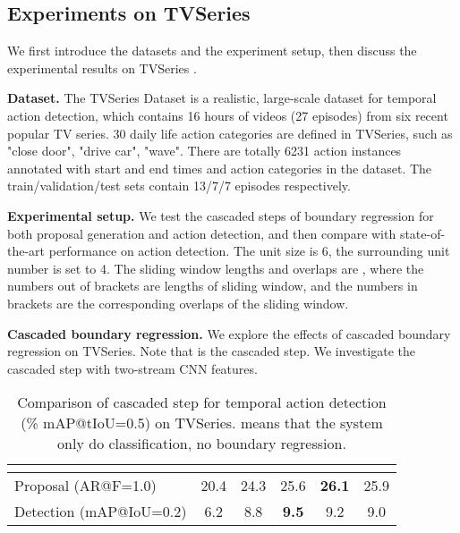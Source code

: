 \documentclass{bmvc2k}
\begin{document}
\subsection{Experiments on TVSeries}
We first introduce the datasets and the experiment setup, then discuss the experimental results on TVSeries \cite{de2016online}.

\textbf{Dataset.} The TVSeries Dataset \cite{de2016online} is a realistic, large-scale dataset for temporal action detection, which contains 16 hours of videos (27 episodes) from six recent popular TV series. 30 daily life action categories are defined in TVSeries, such as "close door", "drive car", "wave". There are totally 6231 action instances annotated with start and end times and action categories in the dataset. The train/validation/test sets contain 13/7/7 episodes respectively.

\textbf{Experimental setup.} We test the cascaded steps of boundary regression for both proposal generation and action detection, and then compare with state-of-the-art performance on action detection. The unit size  is 6, the surrounding unit number  is set to 4. The sliding window lengths and overlaps are , where the numbers out of brackets are lengths of sliding window, and the numbers in brackets are the corresponding overlaps of the sliding window.



\textbf{Cascaded boundary regression.}
We explore the effects of cascaded boundary regression on TVSeries. Note that  is the cascaded step. We investigate the cascaded step with two-stream CNN features.

\begin{table}[h]\small
\centering
\caption{Comparison of cascaded step  for temporal action detection (\% mAP@tIoU=0.5) on TVSeries.  means that the system only do classification, no boundary regression.}
\label{cas-tv}
\begin{tabular}{l|c|c|c|c|c}
\hline
           & \multicolumn{1}{c|}{} &  & \multicolumn{1}{c|}{} & \multicolumn{1}{c|}{} & \multicolumn{1}{c}{} \\ \hline
Proposal (AR@F=1.0)        & 20.4 &   24.3  &      25.6      &       \textbf{26.1}       &     25.9      \\ \hline
Detection (mAP@IoU=0.2) & 6.2 &   8.8  &      \textbf{9.5}   &        9.2      &        9.0       \\ \hline
\end{tabular}
\end{table}
\end{document}
